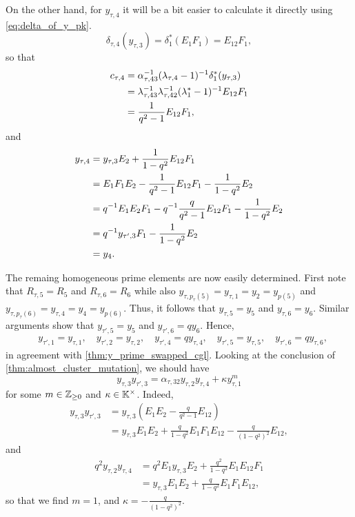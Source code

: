 \begin{example}
	On the other hand, for $y_{\tau, 4}$ it will be a bit easier to calculate it directly
	using \cref{eq:delta_of_y_pk}.
	\begin{equation*}
		\delta_{\tau, 4}(y_{\tau, 3}) = \delta_1^*(E_1F_1) = E_{12}F_1,
	\end{equation*}
	so that
	\begin{align*}
		c_{\tau, 4}
		 & = \alpha_{\tau, 43}^{-1} (\lambda_{\tau, 4} - 1)^{-1} \delta_1^*(y_{\tau, 3})     \\
		 & = \lambda_{\tau, 43}^{-1} \lambda_{\tau, 42}^{-1} (\lambda_1^* - 1)^{-1} E_{12}F_1 \\
		 & = \frac{1}{q^2 - 1}E_{12}F_1,
	\end{align*}
	and
	\begin{align*}
		y_{\tau, 4}
		 & = y_{\tau, 3}E_2 + \frac{1}{1-q^2}E_{12}F_1                               \\
		 & = E_1F_1E_2  - \frac{1}{q^2 - 1}E_{12}F_1 - \frac{1}{1-q^2}E_2            \\
		 & = q^{-1} E_1E_2F_1  - q^{-1}\frac{q}{q^2 - 1}E_{12}F_1 - \frac{1}{1-q^2}E_2 \\
		 & = q^{-1} y_{\tau', 3}F_1 - \frac{1}{1-q^2}E_2                              \\
		 & = y_4.
	\end{align*}

	The remaing homogeneous prime elements are now easily determined. First note that
	$R_{\tau, 5} = R_5$ and $R_{\tau, 6} = R_6$ while also $y_{\tau, p_\tau(5)} = y_{\tau,
				1} = y_2 = y_{p(5)}$ and $y_{\tau, p_\tau(6)} = y_{\tau, 4} = y_4 = y_{p(6)}$. Thus, it
	follows that $y_{\tau, 5} = y_5$ and $y_{\tau, 6} = y_6$. Similar arguments show that
	$y_{\tau', 5} = y_5$ and $y_{\tau', 6} = q y_{6}$. Hence,
	\begin{align*}
		 & y_{\tau', 1} = y_{\tau, 1},\quad y_{\tau', 2} = y_{\tau, 2},\quad y_{\tau', 4} = qy_{\tau, 4},\quad y_{\tau', 5} = y_{\tau, 5},\quad y_{\tau', 6} = qy_{\tau, 6},
	\end{align*}
	in agreement with \cref{thm:y_prime_swapped_cgl}. Looking at the conclusion of \cref{thm:almost_cluster_mutation}, we should have
	\begin{equation*}
		y_{\tau, 3}y_{\tau', 3} = \alpha_{\tau, 32}y_{\tau, 2}y_{\tau, 4} + \kappa y_{\tau, 1}^m
	\end{equation*}
	for some $m \in \mathbb{Z}_{\geq 0}$ and $\kappa \in \mathbb{K}^\times$. Indeed,
	\begin{align*}
		y_{\tau, 3}y_{\tau',3}
		 & = y_{\tau, 3}(E_1 E_2 - \frac{q}{q^2 - 1}E_{12})                                  \\
		 & = y_{\tau, 3}E_1 E_2 + \frac{q}{1-q^2}E_1 F_1 E_{12} - \frac{q}{(1-q^2)^2}E_{12},
	\end{align*}
	and
	\begin{align*}
		q^2 y_{\tau, 2} y_{\tau, 4}
		 & = q^2 E_1 y_{\tau, 3} E_2 + \frac{q^2}{1-q^2}E_1 E_{12} F_1 \\
		 & = y_{\tau, 3} E_1 E_2 + \frac{q}{1-q^2} E_1 F_1 E_{12},
	\end{align*}
	so that we find $m = 1$, and $\kappa = -\frac{q}{(1-q^2)^2}$.
\end{example}

